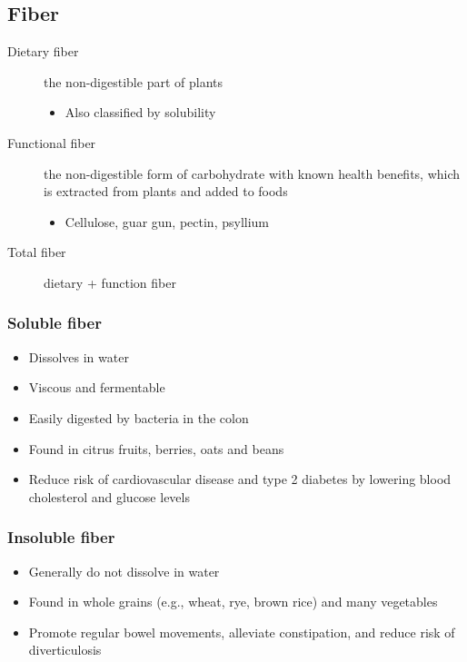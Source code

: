\documentclass[title={Chapter 4}]{fdsn201notes}
\begin{document}
\subsection{Fiber}\label{subsec:fiber}
\begin{description}
	\item[Dietary fiber] the non-digestible part of plants
	\begin{itemize}
		\item Also classified by solubility
	\end{itemize}
	\item[Functional fiber] the non-digestible form of carbohydrate with known health benefits, which is extracted from plants and added to foods
	\begin{itemize}
		\item Cellulose, guar gun, pectin, psyllium
	\end{itemize}
	\item[Total fiber] dietary + function fiber
\end{description}

\subsubsection{Soluble fiber}\label{subsubsec:soluble-fiber}
\begin{itemize}
	\item Dissolves in water
	\item Viscous and fermentable
	\item Easily digested by bacteria in the colon
	\item Found in citrus fruits, berries, oats and beans
	\item Reduce risk of cardiovascular disease and type 2 diabetes by lowering blood cholesterol and glucose levels
\end{itemize}

\subsubsection{Insoluble fiber}\label{subsubsec:insoluble-fiber}
\begin{itemize}
	\item Generally do not dissolve in water
	\item Found in whole grains (e.g., wheat, rye, brown rice) and many vegetables
	\item Promote regular bowel movements, alleviate constipation, and reduce risk of diverticulosis
\end{itemize}
\end{document}

